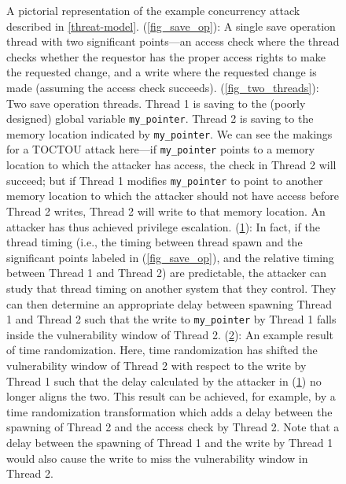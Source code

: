 \begin{figure}
\begin{subfigure}{\columnwidth}
		\caption{}
		\label{fig_attack}
	\end{subfigure}
	\begin{subfigure}{\columnwidth}
		\caption{}
		\label{fig_thwart}
	\end{subfigure}
	\caption{
		A pictorial representation of the example concurrency attack described in \autoref{threat-model}.
		(\ref{fig_save_op}): A single save operation thread with two significant points---an access check where the thread checks whether the requestor has the proper access rights to make the requested change, and a write where the requested change is made (assuming the access check succeeds).
		(\ref{fig_two_threads}): Two save operation threads.
		Thread 1 is saving to the (poorly designed) global variable \texttt{my\_pointer}.
		Thread 2 is saving to the memory location indicated by \texttt{my\_pointer}.
		We can see the makings for a TOCTOU attack here---if \texttt{my\_pointer} points to a memory location to which the attacker has access, the check in Thread 2 will succeed; but if Thread 1 modifies \texttt{my\_pointer} to point to another memory location to which the attacker should not have access before Thread 2 writes, Thread 2 will write to that memory location.
		An attacker has thus achieved privilege escalation.
		(\ref{fig_attack}): In fact, if the thread timing (i.e., the timing between thread spawn and the significant points labeled in (\ref{fig_save_op}), and the relative timing between Thread 1 and Thread 2) are predictable, the attacker can study that thread timing on another system that they control.
		They can then determine an appropriate delay between spawning Thread 1 and Thread 2 such that the write to \texttt{my\_pointer} by Thread 1 falls inside the vulnerability window of Thread 2.
		(\ref{fig_thwart}): An example result of time randomization.
		Here, time randomization has shifted the vulnerability window of Thread 2 with respect to the write by Thread 1 such that the delay calculated by the attacker in (\ref{fig_attack}) no longer aligns the two.
		This result can be achieved, for example, by a time randomization transformation which adds a delay between the spawning of Thread 2 and the access check by Thread 2.
		Note that a delay between the spawning of Thread 1 and the write by Thread 1 would also cause the write to miss the vulnerability window in Thread 2.
	}
	\label{fig_exploitation}
\end{figure}
